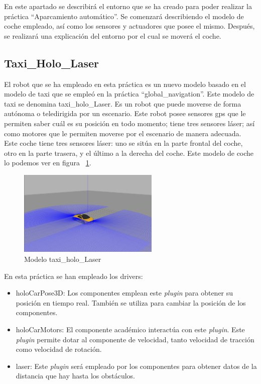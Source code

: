 En este apartado se describirá el entorno que se ha creado para poder realizar la práctica ``Aparcamiento automático''. Se comenzará describiendo el modelo de coche empleado, así como los sensores y actuadores que posee el mismo. Después, se realizará una explicación del entorno por el cual se moverá el coche.

\subsection{Taxi\_Holo\_Laser}
El robot que se ha empleado en esta práctica es un nuevo modelo basado en el modelo de taxi que se empleó en la práctica ``global\_navigation''. Este modelo de taxi se denomina taxi\_holo\_Laser. Es un robot que puede moverse de forma autónoma o teledirigida por un escenario. Este robot posee sensores \acrshort{gps} que le permiten saber cuál es su posición en todo momento; tiene tres sensores láser; así como motores que le permiten moverse por el escenario de manera adecuada.\\


Este coche tiene tres sensores láser: uno se sitúa en la parte frontal del coche, otro en la parte trasera, y el último a la derecha del coche. Este modelo de coche lo podemos ver en figura ~\ref{fig.taxiAutopark}.\\

\begin{figure}[H]
  \begin{center}
    \includegraphics[width=0.6\textwidth]{figures/Autopark/taxiAutopark.png}
		\caption{Modelo taxi\_holo\_Laser}
		\label{fig.taxiAutopark}
		\end{center}
\end{figure}

En esta práctica se han empleado los drivers:

\begin{itemize}
\item holoCarPose3D: Los componentes emplean este \textit{plugin} para obtener su posición en tiempo real. También se utiliza para cambiar la posición de los componentes.
\item	holoCarMotors: El componente académico interactúa con este \textit{plugin}. Este \textit{plugin} permite dotar al componente de velocidad, tanto velocidad de tracción como velocidad de rotación.
\item	laser: Este \textit{plugin} será empleado por los componentes para obtener datos de la distancia que hay hasta los obstáculos.
\end{itemize}

